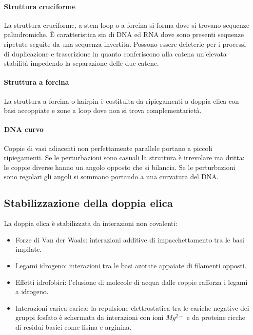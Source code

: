 			\paragraph{Struttura cruciforme}
			La struttura cruciforme, a stem loop o a forcina si forma dove si trovano sequenze palindromiche. 
			\`E caratteristica sia di DNA ed RNA dove sono presenti sequenze ripetute seguite da una sequenza invertita. 
			Possono essere deleterie per i processi di duplicazione e trascrizione in quanto conferiscono alla catena un'elevata stabilit\`a impedendo la separazione delle due catene. 

			\paragraph{Struttura a forcina}
			La struttura a forcina o hairpin \`e costituita da ripiegamenti a doppia elica con basi accoppiate e zone a loop dove non si trova complementariet\`a.

			\paragraph{DNA curvo}
			Coppie di vasi adiacenti non perfettamente parallele portano a piccoli ripiegamenti.
			Se le perturbazioni sono casuali la struttura \`e irrevolare ma dritta: le coppie diverse hanno un angolo opposto che si bilancia.
			Se le perturbazioni sono regolari gli angoli si sommano portando a una curvatura del DNA.

	\subsection{Stabilizzazione della doppia elica}
	La doppia elica \`e stabilizzata da interazioni non covalenti:
	\begin{multicols}{2}
		\begin{itemize}
			\item Forze di Van der Waals: interazioni additive di impacchettamento tra le basi impilate.
			\item Legami idrogeno: interazioni tra le basi azotate appaiate di filamenti opposti.
			\item Effetti idrofobici: l'elusione di molecole di acqua dalle coppie rafforza i legami a idrogeno.
			\item Interazioni carica-carica: la repulsione elettrostatica tra le cariche negative dei gruppi fosfato \`e schermata da interazioni con ioni \emph{$Mg^{2+}$} e da proteine ricche di residui basici come lisina e arginina.
		\end{itemize}
	\end{multicols}

